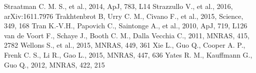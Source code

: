 \documentclass[useAMS,usenatbib]{mn2e}
\begin{document}
\begin{thebibliography}{}
 Straatman C. M. S., et al., 2014, ApJ, 783, L14
 Strazzullo V., et al., 2016, arXiv:1611.7976
 Trakhtenbrot B, Urry C. M., Civano F., et al., 2015, Science, 349, 168
 Tran K.-V.H., Papovich C., Saintonge A., et al., 2010, ApJ, 719, L126
 van de Voort F., Schaye J., Booth C. M., Dalla Vecchia C., 2011, MNRAS, 415, 2782
 Wellons S., et al., 2015, MNRAS, 449, 361
 Xie L., Guo Q., Cooper A. P., Frenk C. S., Li R., Gao L., 2015, MNRAS, 447, 636
 Yates R. M., Kauffmann G., Guo Q., 2012, MNRAS, 422, 215

\end{thebibliography}
\end{document}
